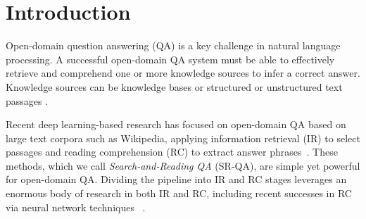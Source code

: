 \documentclass[letterpaper]{article} %
\begin{document}
\section{Introduction}
Open-domain question answering (QA) is a key challenge in natural language processing. A successful open-domain QA system must be able to effectively retrieve and comprehend one or more knowledge sources to infer a correct answer. Knowledge sources can be knowledge bases \cite{berant2013semantic,yu2017improved} or structured or unstructured text passages \cite{ferrucci2010building,baudivs2015modeling}.

Recent deep learning-based research has focused on open-domain QA based on large text corpora such as Wikipedia, applying %
information retrieval (IR) to select passages and reading comprehension (RC) to extract answer phrases~\cite{chen2017reading,dhingra2017quasar}. 
These methods, which we call \emph{Search-and-Reading QA} (SR-QA), are simple yet powerful for open-domain QA.  Dividing the pipeline into IR and RC stages leverages an enormous body of research in both IR and RC, including recent successes in RC via neural network techniques
~\cite{wang2016machine,wang2016multi,xiong2016dynamic,wang2017gated}. 
\end{document}
